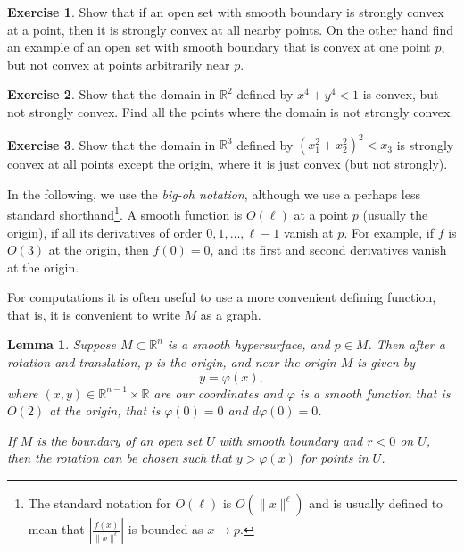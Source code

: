 \documentclass[12pt,openany]{book}
\newcommand{\snorm}[1]{\lVert {#1} \rVert}
\newcommand{\abs}[1]{\left\lvert {#1} \right\rvert}
\newcommand{\R}{{\mathbb{R}}}
\newcommand{\myindex}[1]{#1\index{#1}}
\theoremstyle{plain}
\newtheorem{lemma}[thm]{Lemma}
\theoremstyle{remark}
\theoremstyle{definition}
\newenvironment{exbox}{%
    \def\FrameCommand{\vrule width 1pt \relax\hspace{10pt}}%
    \MakeFramed {\advance \hsize -\width \FrameRestore}%
}{%
    \endMakeFramed
}
\theoremstyle{exercise}
\newtheorem{exercise}{Exercise}[section]
\theoremstyle{example}
\begin{document}
\begin{exbox}
\begin{exercise}
Show that if an open set with smooth boundary is strongly convex at a point, then it is
strongly convex at all nearby points.  On the other hand find an example of
an open set with smooth boundary that is convex at one point $p$, but not convex at points
arbitrarily near $p$.
\end{exercise}

\begin{exercise}
Show that the domain in $\R^2$ defined by $x^4+y^4 < 1$ is convex, but not strongly convex.
Find all the points where the domain is not strongly convex.
\end{exercise}

\begin{exercise}
Show that the domain in $\R^3$ defined by ${(x_1^2+x_2^2)}^2 < x_3$ is
strongly convex at all points except the origin, where it is just convex
(but not strongly).
\end{exercise}
\end{exbox}

In the following, %
we use the \emph{\myindex{big-oh notation}},
although we use a perhaps less standard shorthand\footnote{%
The standard notation for $O(\ell)$ is $O(\snorm{x}^{\ell})$ and
is usually defined to mean that
$\abs{\frac{f(x)}{\snorm{x}^\ell}}$ is bounded as $x \to p$.}.
A smooth function is $O(\ell)$ at a point $p$ (usually the origin),
if all its derivatives of order $0, 1, \ldots,  \ell-1$ vanish at $p$.
For example, if $f$ is $O(3)$ at the origin,
then $f(0)=0$, and its first and second derivatives vanish at the origin.

For computations it is often useful to use a more convenient
defining function, that is, it is convenient to write $M$ as a graph.

\begin{lemma} \label{lemma:realgraphcoords}
Suppose $M \subset \R^n$ is a smooth hypersurface, 
and $p \in M$.  Then after a rotation and translation, 
$p$ is the origin, and near the origin $M$ is given by
\begin{equation*}
y = \varphi(x) ,
\end{equation*}
where $(x,y) \in \R^{n-1} \times \R$ are our coordinates and
$\varphi$ is a smooth %
function that is $O(2)$ at the origin,
that is $\varphi(0) = 0$ and $d\varphi(0) = 0$.

If $M$ is the boundary of an open set $U$ with smooth boundary and
$r < 0$ on $U$,
then the rotation can be chosen
such that 
$y > \varphi(x)$
for points in $U$.
\end{lemma}
\end{document}
